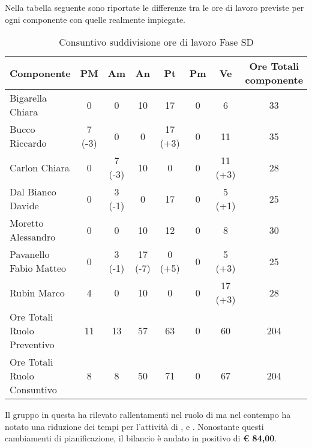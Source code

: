 			Nella tabella seguente sono riportate le differenze tra le ore di lavoro previste per ogni componente con quelle realmente impiegate.
			\begin{table}[H]
				\begin{center}
					\begin{tabular}{| l | c | c | c | c | c | c | c |}
						\hline
						Componente 					& PM	& Am	& An 		& Pt 		& Pm 	& Ve 	& Ore Totali componente \\ \hline
						
						Bigarella Chiara 			& 0		& 0		& 10 		& 17 		& 0		& 6 		& 33 \\
						Bucco Riccardo 				& 7 (-3)& 0		& 0			& 17 (+3) 	& 0		& 11 		& 35 \\
						Carlon Chiara				& 0		& 7 (-3)& 10 		& 0			& 0		& 11 (+3)	& 28 \\
						Dal Bianco Davide 			& 0		& 3 (-1)& 0			& 17 		& 0		& 5	(+1)	& 25 \\
						Moretto Alessandro 			& 0		& 0 	& 10 		& 12 		& 0		& 8 		& 30 \\
						Pavanello Fabio Matteo		& 0		& 3 (-1)& 17 (-7)	& 0	(+5)	& 0		& 5	(+3)	& 25 \\
						Rubin Marco					& 4 	& 0		& 10 		& 0			& 0		& 17 (+3)	& 28 \\ \hline \hline
						
						Ore Totali Ruolo Preventivo	& 11 	& 13 	& 57 		& 63 		& 0		& 60		& 204\\ 
						Ore Totali Ruolo Consuntivo	& 8 	& 8 	& 50 		& 71 		& 0		& 67		& 204\\ \hline
					\end{tabular}
				\end{center}
				\caption{Consuntivo suddivisione ore di lavoro Fase SD}
			\end{table}
			Il gruppo \groupname{} in questa  ha rilevato rallentamenti nel ruolo di  ma nel contempo ha notato una riduzione dei tempi per l'attività di ,  e . Nonostante questi cambiamenti di pianificazione, il bilancio è andato in positivo di \textbf{\euro{} 84,00}.

